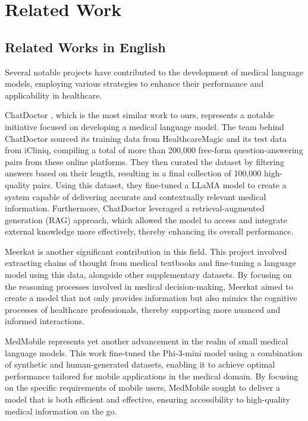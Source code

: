 \documentclass[conference]{IEEEtran}
\begin{document}
	\section{Related Work}
	
	\subsection{Related Works in English}
	Several notable projects have contributed to the development of medical language models, employing various strategies to enhance their performance and applicability in healthcare.
	
	ChatDoctor
	\cite{b6}, which is the most similar work to ours, represents a notable initiative focused on developing a medical language model. The team behind ChatDoctor sourced its training data from HealthcareMagic and its test data from iCliniq, compiling a total of more than 200,000 free-form question-answering pairs from these online platforms. They then curated the dataset by filtering answers based on their length, resulting in a final collection of 100,000 high-quality pairs. Using this dataset, they fine-tuned a LLaMA model \cite{b7} to create a system capable of delivering accurate and contextually relevant medical information. Furthermore, ChatDoctor leveraged a retrieval-augmented generation (RAG) approach, which allowed the model to access and integrate external knowledge more effectively, thereby enhancing its overall performance.
	
	Meerkat
	\cite{b8}
	is another significant contribution in this field. This project involved extracting chains of thought from medical textbooks and fine-tuning a language model using this data, alongside other supplementary datasets. By focusing on the reasoning processes involved in medical decision-making, Meerkat aimed to create a model that not only provides information but also mimics the cognitive processes of healthcare professionals, thereby supporting more nuanced and informed interactions.
	
	MedMobile
	\cite{b9}
	represents yet another advancement in the realm of small medical language models. This work fine-tuned the Phi-3-mini model
	\cite{b10}
	using a combination of synthetic and human-generated datasets, enabling it to achieve optimal performance tailored for mobile applications in the medical domain. By focusing on the specific requirements of mobile users, MedMobile sought to deliver a model that is both efficient and effective, ensuring accessibility to high-quality medical information on the go.
\end{document}
